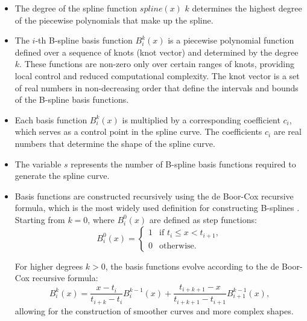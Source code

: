 \documentclass{article}
\begin{document}
\begin{itemize}

\item The degree of the spline function \(spline(x)\) \( k \) determines the highest degree of the piecewise polynomials that make up the spline.

\item The \( i \)-th B-spline basis function \( B_i^k(x) \) is a piecewise polynomial function defined over a sequence of knots (knot vector) and determined by the degree \( k \). These functions are non-zero only over certain ranges of knots, providing local control and reduced computational complexity. The knot vector is a set of real numbers in non-decreasing order that define the intervals and bounds of the B-spline basis functions. 


\item Each basis function \( B_i^k(x) \) is multiplied by a corresponding coefficient \( c_i \), which serves as a control point in the spline curve. The coefficients \( c_i \) are real numbers that determine the shape of the spline curve. 

\item The variable \( s \) represents the number of B-spline basis functions required to generate the spline curve.

\item Basis functions are constructed recursively using the de Boor-Cox recursive formula, which is the most widely used definition for constructing B-splines \parencite{de1972calculating} \parencite{cox1972numerical}. Starting from \( k=0 \), where \( B_i^0(x) \) are defined as step functions:
    \begin{equation}
    B_i^0(x) = 
    \begin{cases} 
    1 & \text{if } t_i \leq x < t_{i+1}, \\
    0 & \text{otherwise}.
    \end{cases}
    \end{equation}
    
For higher degrees \( k > 0 \), the basis functions evolve according to the de Boor-Cox recursive formula:
    \begin{equation}
    B_i^k(x) = \frac{x - t_i}{t_{i+k} - t_i} B_i^{k-1}(x) + \frac{t_{i+k+1} - x}{t_{i+k+1} - t_{i+1}} B_{i+1}^{k-1}(x),
    \end{equation}
    allowing for the construction of smoother curves and more complex shapes. 
    
\end{itemize}
\end{document}
